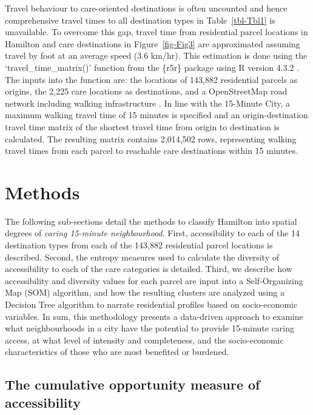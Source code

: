 \documentclass[
  authoryear,
  preprint,
  3p]{elsarticle}
\begin{document}
Travel behaviour to care-oriented destinations is often uncounted and
hence comprehensive travel times to all destination types in
Table~\ref{tbl-Tbl1} is unavailable. To overcome this gap, travel time
from residential parcel locations in Hamilton and care destinations in
Figure~\ref{fig-Fig3} are approximated assuming travel by foot at an
average speed (3.6 km/hr). This estimation is done using the
`travel\_time\_matrix()' function from the \{r5r\} package
\citep{pereiraR5rRapidRealistic2021} using R version 4.3.2
\citep{coreR2023}. The inputs into the function are: the locations of
143,882 residential parcels as origins, the 2,225 care locations as
destinations, and a OpenStreetMap road network including walking
infrastructure \citep{geofabrikOntarioCanadaOpen2023}. In line with the
15-Minute City, a maximum walking travel time of 15 minutes is specified
and an origin-destination travel time matrix of the shortest travel time
from origin to destination is calculated. The resulting matrix contains
2,014,502 rows, representing walking travel times from each parcel to
reachable care destinations within 15 minutes.

\section{Methods}\label{methods}

The following sub-sections detail the methods to classify Hamilton into
spatial degrees of \emph{caring 15-minute neighbourhood}. First,
accessibility to each of the 14 destination types from each of the
143,882 residential parcel locations is described. Second, the entropy
measures used to calculate the diversity of accessibility to each of the
care categories is detailed. Third, we describe how accessibility and
diversity values for each parcel are input into a Self-Organizing Map
(SOM) algorithm, and how the resulting clusters are analyzed using a
Decision Tree algorithm to narrate residential profiles based on
socio-economic variables. In sum, this methodology presents a
data-driven approach to examine what neighbourhoods in a city have the
potential to provide 15-minute caring access, at what level of intensity
and completeness, and the socio-economic characteristics of those who
are most benefited or burdened.

\subsection{The cumulative opportunity measure of
accessibility}\label{the-cumulative-opportunity-measure-of-accessibility}
\end{document}
